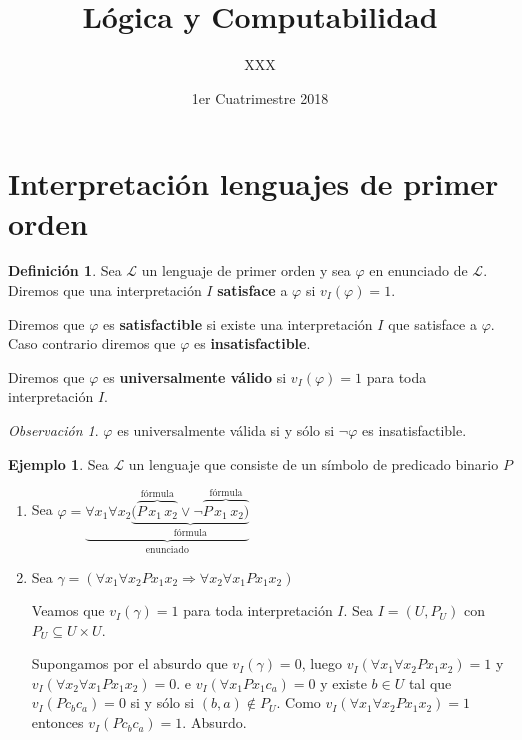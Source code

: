 \documentclass[a4paper,11pt]{article}
\title{Lógica y Computabilidad}
\author{XXX}
\date{1er Cuatrimestre 2018}
\theoremstyle{definition}
\newtheorem{defn}{Definición}[section]
\newtheorem{exap}{Ejemplo}[section]
\theoremstyle{remark}
\newtheorem*{remk}{Observación}
\def\LL{\ensuremath{\mathcal{L}}}
\begin{document}
\maketitle

\section{Interpretación lenguajes de primer orden}

\begin{defn}
    Sea $\LL$ un lenguaje de primer orden y sea $\varphi$ en enunciado de $\LL$. 
    Diremos que una interpretación $I$ \textbf{satisface} a $\varphi$
    si $v_I(\varphi) = 1$.

    Diremos que $\varphi$ es \textbf{satisfactible} si existe una
    interpretación $I$ que satisface a $\varphi$. Caso contrario diremos
    que $\varphi$ es \textbf{insatisfactible}.

    Diremos que $\varphi$ es \textbf{universalmente válido} si
    $v_I(\varphi) = 1$ para toda interpretación $I$.
\end{defn}

\begin{remk}
    $\varphi$ es universalmente válida si y sólo si $\lnot \varphi$
    es insatisfactible.
\end{remk}

\begin{exap}
    Sea $\LL$ un lenguaje que consiste de un símbolo de predicado
    binario $P$

    \begin{enumerate}
        \item Sea $\varphi = \underbrace{\forall x_1 \forall x_2 
        \underbrace{(\overbrace{P\,x_1\,x_2}^{\text{fórmula}} \lor 
        \lnot \overbrace{P\, x_1\,x_2)}^{\text{fórmula}}}_{\text{fórmula}}}_{\text{enunciado}}$

        \item Sea $\gamma = (\forall x_1 \forall x_2 P x_1 x_2
        \Rightarrow \forall x_2 \forall x_1 P x_1 x_2)$

        Veamos que $v_I(\gamma) = 1$ para toda interpretación $I$. 
        Sea $I = (U, P_U)$ con $P_U \subseteq U\times U$.

        Supongamos por el absurdo que $v_I(\gamma) = 0$, luego
        $v_I(\forall x_1 \forall x_2 P x_1 x_2) = 1$ y 
        $v_I(\forall x_2 \forall x_1 P x_1 x_2) = 0$.
        e $v_I(\forall x_1 P x_1 c_a) = 0$
        y existe $b \in U$ tal que $v_I(P c_b c_a) = 0$ si y sólo si
        $(b, a) \not\in P_U$. Como $v_I(\forall x_1 \forall x_2 P x_1 x_2) = 1$
        entonces $v_I(P c_b c_a) = 1$. Absurdo.
    \end{enumerate}
\end{exap}
\end{document}
